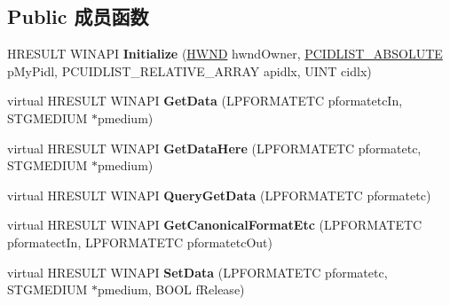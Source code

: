 \subsection*{Public 成员函数}
\begin{DoxyCompactItemize}
\item 
\mbox{\label{class_c_i_d_l_data_obj_ac4f48c9fafb4db1f8a7accb04eb74b33}} 
H\+R\+E\+S\+U\+LT W\+I\+N\+A\+PI {\bfseries Initialize} (\hyperlink{interfacevoid}{H\+W\+ND} hwnd\+Owner, \hyperlink{struct___i_t_e_m_i_d_l_i_s_t___a_b_s_o_l_u_t_e}{P\+C\+I\+D\+L\+I\+S\+T\+\_\+\+A\+B\+S\+O\+L\+U\+TE} p\+My\+Pidl, P\+C\+U\+I\+D\+L\+I\+S\+T\+\_\+\+R\+E\+L\+A\+T\+I\+V\+E\+\_\+\+A\+R\+R\+AY apidlx, U\+I\+NT cidlx)
\item 
\mbox{\label{class_c_i_d_l_data_obj_a311c0e04a18d4db5120bdb56ce63b6ce}} 
virtual H\+R\+E\+S\+U\+LT W\+I\+N\+A\+PI {\bfseries Get\+Data} (L\+P\+F\+O\+R\+M\+A\+T\+E\+TC pformatetc\+In, S\+T\+G\+M\+E\+D\+I\+UM $\ast$pmedium)
\item 
\mbox{\label{class_c_i_d_l_data_obj_ab719c400cc5afe332d942980a735ad7c}} 
virtual H\+R\+E\+S\+U\+LT W\+I\+N\+A\+PI {\bfseries Get\+Data\+Here} (L\+P\+F\+O\+R\+M\+A\+T\+E\+TC pformatetc, S\+T\+G\+M\+E\+D\+I\+UM $\ast$pmedium)
\item 
\mbox{\label{class_c_i_d_l_data_obj_a0286e9f20b0bcbb2f87f8d0a2a106d49}} 
virtual H\+R\+E\+S\+U\+LT W\+I\+N\+A\+PI {\bfseries Query\+Get\+Data} (L\+P\+F\+O\+R\+M\+A\+T\+E\+TC pformatetc)
\item 
\mbox{\label{class_c_i_d_l_data_obj_abc66ec93a00d6b8eb212a6857eb26346}} 
virtual H\+R\+E\+S\+U\+LT W\+I\+N\+A\+PI {\bfseries Get\+Canonical\+Format\+Etc} (L\+P\+F\+O\+R\+M\+A\+T\+E\+TC pformatect\+In, L\+P\+F\+O\+R\+M\+A\+T\+E\+TC pformatetc\+Out)
\item 
\mbox{\label{class_c_i_d_l_data_obj_a48537f1e39a4e98f1cb85d06c7ca0240}} 
virtual H\+R\+E\+S\+U\+LT W\+I\+N\+A\+PI {\bfseries Set\+Data} (L\+P\+F\+O\+R\+M\+A\+T\+E\+TC pformatetc, S\+T\+G\+M\+E\+D\+I\+UM $\ast$pmedium, B\+O\+OL f\+Release)
\item 
\mbox{\label{class_c_i_d_l_data_obj_ac7bbbf95d3723e76eae56cd7a93b48c3}} 

\end{DoxyCompactItemize}
